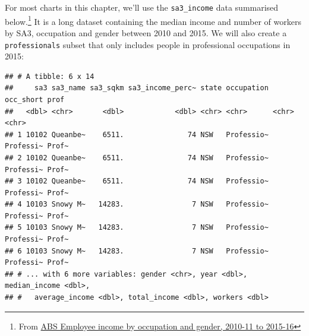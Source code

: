 \documentclass[]{book}
\newenvironment{Shaded}{\begin{snugshade}}{\end{snugshade}}
\newcommand{\CommentTok}[1]{\textcolor[rgb]{0.56,0.35,0.01}{\textit{#1}}}
\newcommand{\DecValTok}[1]{\textcolor[rgb]{0.00,0.00,0.81}{#1}}
\newcommand{\KeywordTok}[1]{\textcolor[rgb]{0.13,0.29,0.53}{\textbf{#1}}}
\newcommand{\NormalTok}[1]{#1}
\newcommand{\OperatorTok}[1]{\textcolor[rgb]{0.81,0.36,0.00}{\textbf{#1}}}
\newcommand{\StringTok}[1]{\textcolor[rgb]{0.31,0.60,0.02}{#1}}
\begin{document}
For most charts in this chapter, we'll use the \texttt{sa3\_income} data summarised below.\footnote{From \href{https://www.abs.gov.au/AUSSTATS/abs@.nsf/DetailsPage/6524.0.55.0022011-2016?OpenDocument}{ABS Employee income by occupation and gender, 2010-11 to 2015-16}} It is a long dataset containing the median income and number of workers by SA3, occupation and gender between 2010 and 2015. We will also create a \texttt{professionals} subset that only includes people in professional occupations in 2015:

\begin{Shaded}
\end{Shaded}

\begin{verbatim}
## # A tibble: 6 x 14
##     sa3 sa3_name sa3_sqkm sa3_income_perc~ state occupation occ_short prof 
##   <dbl> <chr>       <dbl>            <dbl> <chr> <chr>      <chr>     <chr>
## 1 10102 Queanbe~    6511.               74 NSW   Professio~ Professi~ Prof~
## 2 10102 Queanbe~    6511.               74 NSW   Professio~ Professi~ Prof~
## 3 10102 Queanbe~    6511.               74 NSW   Professio~ Professi~ Prof~
## 4 10103 Snowy M~   14283.                7 NSW   Professio~ Professi~ Prof~
## 5 10103 Snowy M~   14283.                7 NSW   Professio~ Professi~ Prof~
## 6 10103 Snowy M~   14283.                7 NSW   Professio~ Professi~ Prof~
## # ... with 6 more variables: gender <chr>, year <dbl>, median_income <dbl>,
## #   average_income <dbl>, total_income <dbl>, workers <dbl>
\end{verbatim}
\end{document}
